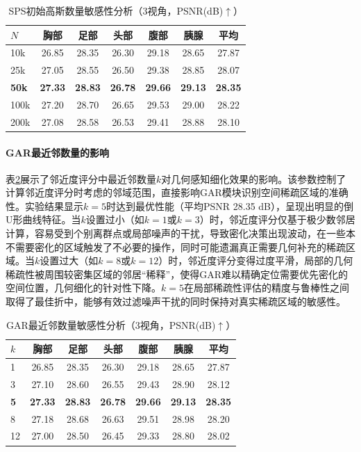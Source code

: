 \begin{table}[htbp]
    \centering
    \caption{SPS初始高斯数量敏感性分析（3视角，PSNR(dB)$\uparrow$）}
    \label{tab:spags_sps_hyper}
    \begin{tabular*}{0.85\textwidth}{@{\extracolsep{\fill}}lcccccc@{}}
        \toprule
        $N$ & 胸部 & 足部 & 头部 & 腹部 & 胰腺 & 平均 \\
        \midrule
        10k & 26.85 & 28.35 & 26.30 & 29.18 & 28.65 & 27.87 \\
        25k & 27.05 & 28.55 & 26.50 & 29.38 & 28.85 & 28.07 \\
        \textbf{50k} & \textbf{27.33} & \textbf{28.83} & \textbf{26.78} & \textbf{29.66} & \textbf{29.13} & \textbf{28.35} \\
        100k & 27.20 & 28.70 & 26.65 & 29.53 & 29.00 & 28.22 \\
        200k & 27.08 & 28.58 & 26.53 & 29.41 & 28.88 & 28.10 \\
        \bottomrule
    \end{tabular*}
\end{table}

\paragraph{GAR最近邻数量的影响}
表\ref{tab:spags_gar_hyper}展示了邻近度评分中最近邻数量$k$对几何感知细化效果的影响。该参数控制了计算邻近度评分时考虑的邻域范围，直接影响GAR模块识别空间稀疏区域的准确性。实验结果显示$k=5$时达到最优性能（平均PSNR 28.35 dB），呈现出明显的倒U形曲线特征。当$k$设置过小（如$k=1$或$k=3$）时，邻近度评分仅基于极少数邻居计算，容易受到个别离群点或局部噪声的干扰，导致密化决策出现波动，在一些本不需要密化的区域触发了不必要的操作，同时可能遗漏真正需要几何补充的稀疏区域。当$k$设置过大（如$k=8$或$k=12$）时，邻近度评分变得过度平滑，局部的几何稀疏性被周围较密集区域的邻居“稀释”，使得GAR难以精确定位需要优先密化的空间位置，几何细化的针对性下降。$k=5$在局部稀疏性评估的精度与鲁棒性之间取得了最佳折中，能够有效过滤噪声干扰的同时保持对真实稀疏区域的敏感性。

\begin{table}[htbp]
    \centering
    \caption{GAR最近邻数量敏感性分析（3视角，PSNR(dB)$\uparrow$）}
    \label{tab:spags_gar_hyper}
    \begin{tabular*}{0.85\textwidth}{@{\extracolsep{\fill}}lcccccc@{}}
        \toprule
        $k$ & 胸部 & 足部 & 头部 & 腹部 & 胰腺 & 平均 \\
        \midrule
        1 & 26.85 & 28.35 & 26.30 & 29.18 & 28.65 & 27.87 \\
        3 & 27.10 & 28.60 & 26.55 & 29.43 & 28.90 & 28.12 \\
        \textbf{5} & \textbf{27.33} & \textbf{28.83} & \textbf{26.78} & \textbf{29.66} & \textbf{29.13} & \textbf{28.35} \\
        8 & 27.18 & 28.68 & 26.63 & 29.51 & 28.98 & 28.20 \\
        12 & 27.00 & 28.50 & 26.45 & 29.33 & 28.80 & 28.02 \\
        \bottomrule
    \end{tabular*}
\end{table}


